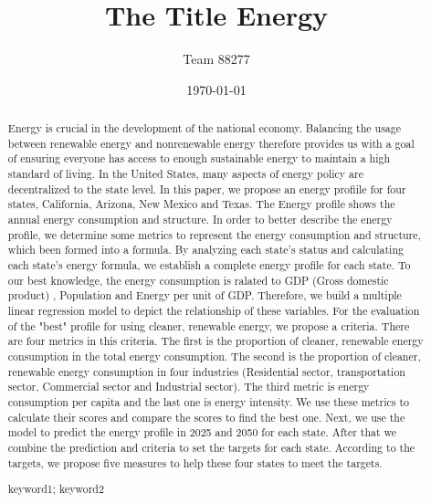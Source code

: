 \documentclass{mcmthesis}
\title{The Title Energy}
\author{Team 88277}
\date{\today}
\begin{document}
\begin{abstract}
  Energy is crucial in the development of the national economy. Balancing the usage between renewable energy and nonrenewable energy therefore provides us with a goal of ensuring everyone has access to enough sustainable energy to maintain a high standard of living.
  In the United States, many aspects of energy policy are decentralized to the state level.
  In this paper, we propose an energy profiile for four states, California, Arizona, New Mexico and Texas. The Energy profile shows the annual energy consumption and structure.
  In order to better describe the energy profile, we determine some metrics to represent the energy consumption and structure, which been formed into a formula.
  By analyzing each state's status and calculating each state's energy formula, we establish a complete energy profile for each state. To our best knowledge, the energy consumption is ralated to
  GDP (Gross domestic product) , Population and Energy per unit of GDP. Therefore, we build a multiple linear regression model to depict the relationship of these variables.
  For the evaluation of the "best" profile for using cleaner, renewable energy, we propose a criteria. There are four metrics in this criteria. The first is the proportion of cleaner, renewable energy consumption in the total energy consumption.
  The second is the proportion of cleaner, renewable energy consumption in four industries (Residential sector, transportation sector, Commercial sector and Industrial sector). The third metric is energy consumption per capita and the last one is energy intensity.
  We use these metrics to calculate their scores and compare the scores to find the best one.
  Next, we use the model to predict the energy profile in 2025 and 2050 for each state. After that we combine the prediction and criteria to set the targets for each state.
  According to the targets, we propose five measures to help these four states to meet the targets.
\begin{keywords}
keyword1; keyword2
\end{keywords}

\end{abstract}

\maketitle                  %
\tableofcontents
\end{document}
